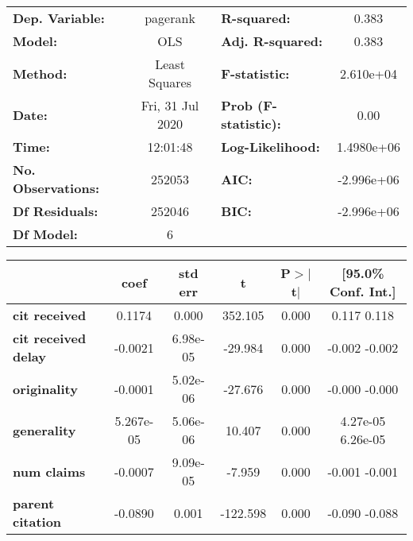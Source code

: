 \begin{center}
\begin{tabular}{lclc}
\toprule
\textbf{Dep. Variable:}     &     pagerank     & \textbf{  R-squared:         } &       0.383    \\
\textbf{Model:}             &       OLS        & \textbf{  Adj. R-squared:    } &       0.383    \\
\textbf{Method:}            &  Least Squares   & \textbf{  F-statistic:       } &   2.610e+04    \\
\textbf{Date:}              & Fri, 31 Jul 2020 & \textbf{  Prob (F-statistic):} &       0.00     \\
\textbf{Time:}              &     12:01:48     & \textbf{  Log-Likelihood:    } &   1.4980e+06   \\
\textbf{No. Observations:}  &      252053      & \textbf{  AIC:               } &   -2.996e+06   \\
\textbf{Df Residuals:}      &      252046      & \textbf{  BIC:               } &   -2.996e+06   \\
\textbf{Df Model:}          &           6      & \textbf{                     } &                \\
\bottomrule
\end{tabular}
\begin{tabular}{lccccc}
                            & \textbf{coef} & \textbf{std err} & \textbf{t} & \textbf{P$>$$|$t$|$} & \textbf{[95.0\% Conf. Int.]}  \\
\midrule
\textbf{cit received}       &       0.1174  &        0.000     &   352.105  &         0.000        &         0.117     0.118       \\
\textbf{cit received delay} &      -0.0021  &     6.98e-05     &   -29.984  &         0.000        &        -0.002    -0.002       \\
\textbf{originality}        &      -0.0001  &     5.02e-06     &   -27.676  &         0.000        &        -0.000    -0.000       \\
\textbf{generality}         &    5.267e-05  &     5.06e-06     &    10.407  &         0.000        &      4.27e-05  6.26e-05       \\
\textbf{num claims}         &      -0.0007  &     9.09e-05     &    -7.959  &         0.000        &        -0.001    -0.001       \\
\textbf{parent citation}    &      -0.0890  &        0.001     &  -122.598  &         0.000        &        -0.090    -0.088       \\

\end{tabular}
\end{center}

